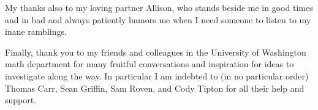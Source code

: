\documentclass[12pt]{article}
\begin{document}
My thanks also to my loving partner Allison, who stands beside me in good times and in bad and always patiently humors me when 
I need someone to listen to my inane ramblings.

Finally, thank you to my friends and colleagues in the University of Washington math department for many fruitful conversations 
and inspiration for ideas to investigate along the way. In particular I am indebted to (in no particular order) Thomas Carr, Sean Griffin, Sam Roven, and Cody Tipton
for all their help and support.

\newpage

\printbibliography
{}
\end{document}
